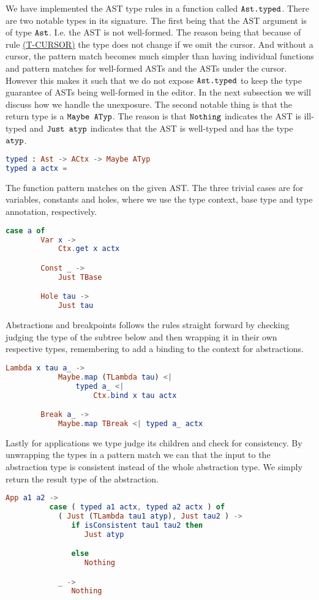 We have implemented the AST type rules in a function called $\texttt{Ast.typed}$.
There are two notable types in its signature. The first being that the AST
argument is of type $\texttt{Ast}$. I.e. the AST is not well-formed. The reason
being that because of rule \hyperref[fig:asttyperules]{(T-CURSOR)} the type
does not change if we omit the cursor. And without a cursor, the pattern match
becomes much simpler than having individual functions and pattern matches for
well-formed ASTs and the ASTs under the cursor. However this makes it such that
we do not expose $\texttt{Ast.typed}$ to keep the type guarantee of ASTs being
well-formed in the editor. In the next subsection we will discuss how we handle
the unexposure. The second notable thing is that the return type is a
$\texttt{Maybe ATyp}$. The reason is that $\texttt{Nothing}$ indicates the AST is
ill-typed and $\texttt{Just atyp}$ indicates that the AST is well-typed and has
the type $\texttt{atyp}$.
\begin{lstlisting}[language=elm,%
    gobble=0,%
    ]
typed : Ast -> ACtx -> Maybe ATyp
typed a actx =
\end{lstlisting}
The  function pattern matches on the given AST. The three trivial
cases are for variables, constants and holes, where we use the type context,
base type and type annotation, respectively.
\begin{lstlisting}[language=elm,%
    gobble=4,%
    ]
    case a of
        Var x ->
            Ctx.get x actx

        Const _ ->
            Just TBase

        Hole tau ->
            Just tau
\end{lstlisting}
Abstractions and breakpoints follows the rules straight forward by checking
judging the type of the subtree below and then wrapping it in their own
respective types, remembering to add a binding to the context for abstractions.
\begin{lstlisting}[language=elm,%
    gobble=8,%
    ]
        Lambda x tau a_ ->
            Maybe.map (TLambda tau) <|
                typed a_ <|
                    Ctx.bind x tau actx

        Break a_ ->
            Maybe.map TBreak <| typed a_ actx
\end{lstlisting}
Lastly for applications we type judge its children and check for consistency.
By unwrapping the types in a pattern match we can that the input to the
abstraction type is consistent instead of the whole abstraction type. We simply
return the result type of the abstraction.
\begin{lstlisting}[language=elm,%
    gobble=8,%
    ]
        App a1 a2 ->
          case ( typed a1 actx, typed a2 actx ) of
            ( Just (TLambda tau1 atyp), Just tau2 ) ->
               if isConsistent tau1 tau2 then
                  Just atyp

               else
                  Nothing

            _ ->
               Nothing
\end{lstlisting}

